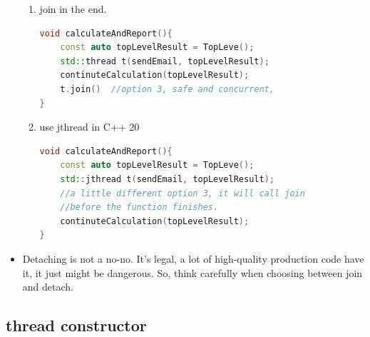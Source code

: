 \documentclass[a4paper,11pt,twoside]{book}
\begin{document}
\begin{itemize}
\begin{enumerate}
		\item join in the end.
\begin{lstlisting}[frame=single, language=c++]
void calculateAndReport(){
	const auto topLevelResult = TopLeve();
	std::thread t(sendEmail, topLevelResult);
	continuteCalculation(topLevelResult);
	t.join()  //option 3, safe and concurrent, 
}			
\end{lstlisting}			

		\item use jthread in C++ 20
\begin{lstlisting}[frame=single, language=c++]
void calculateAndReport(){
	const auto topLevelResult = TopLeve();
	std::jthread t(sendEmail, topLevelResult); 
	//a little different option 3, it will call join 
	//before the function finishes.
	continuteCalculation(topLevelResult);
}			
\end{lstlisting}		
	\end{enumerate} 

		\item Detaching is not a no-no. It’s legal, a lot of high-quality production code have it, it just might be dangerous. So, think carefully when choosing between join and detach.
\end{itemize}

	
\subsection{thread constructor}
\end{document}
